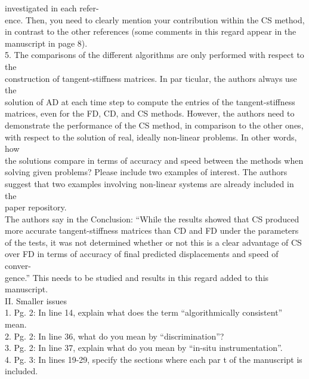 investigated in each refer- \\ence. Then, you need to clearly mention
your contribution within the CS method, \\in contrast to the other
references (some comments in this regard appear in the \\manuscript in
page 8). \\5. The comparisons of the different algorithms are only
performed with respect to the \\construction of tangent-stiffness
matrices. In par ticular, the authors always use the \\solution of AD at
each time step to compute the entries of the tangent-stiffness
\\matrices, even for the FD, CD, and CS methods. However, the authors
need to \\demonstrate the performance of the CS method, in comparison to
the other ones, \\with respect to the solution of real, ideally
non-linear problems. In other words, how \\the solutions compare in
terms of accuracy and speed between the methods when \\solving given
problems? Please include two examples of interest. The authors \\suggest
that two examples involving non-linear systems are already included in
the \\paper repository. \\The authors say in the Conclusion: ``While the
results showed that CS produced \\more accurate tangent-stiffness
matrices than CD and FD under the parameters \\of the tests, it was not
determined whether or not this is a clear advantage of CS \\over FD in
terms of accuracy of ﬁnal predicted displacements and speed of conver-
\\gence.'' This needs to be studied and results in this regard added to
this manuscript. \\II. Smaller issues \\

1. Pg. 2: In line 14, explain what does the term ``algorithmically
consistent'' mean. \\2. Pg. 2: In line 36, what do you mean by
``discrimination''? \\3. Pg. 2: In line 37, explain what do you mean by
``in-situ instrumentation''. \\4. Pg. 3: In lines 19-29, specify the
sections where each par t of the manuscript is \\included. \\

